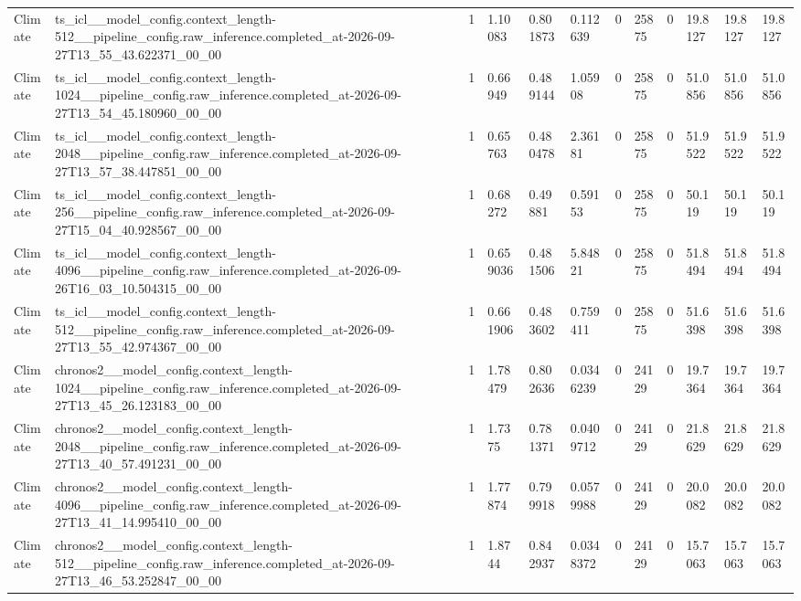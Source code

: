 \begin{tabular}{llllllllllll}
Climate & ts\_icl\_\_model\_config.context\_length-512\_\_pipeline\_config.raw\_inference.completed\_at-2026-09-27T13\_55\_43.622371\_00\_00 & 1 & 1.10083 & 0.801873 & 0.112639 & 0 & 25875 & 0 & 19.8127 & 19.8127 & 19.8127 \\
Climate & ts\_icl\_\_model\_config.context\_length-1024\_\_pipeline\_config.raw\_inference.completed\_at-2026-09-27T13\_54\_45.180960\_00\_00 & 1 & 0.66949 & 0.489144 & 1.05908 & 0 & 25875 & 0 & 51.0856 & 51.0856 & 51.0856 \\
Climate & ts\_icl\_\_model\_config.context\_length-2048\_\_pipeline\_config.raw\_inference.completed\_at-2026-09-27T13\_57\_38.447851\_00\_00 & 1 & 0.65763 & 0.480478 & 2.36181 & 0 & 25875 & 0 & 51.9522 & 51.9522 & 51.9522 \\
Climate & ts\_icl\_\_model\_config.context\_length-256\_\_pipeline\_config.raw\_inference.completed\_at-2026-09-27T15\_04\_40.928567\_00\_00 & 1 & 0.68272 & 0.49881 & 0.59153 & 0 & 25875 & 0 & 50.119 & 50.119 & 50.119 \\
Climate & ts\_icl\_\_model\_config.context\_length-4096\_\_pipeline\_config.raw\_inference.completed\_at-2026-09-26T16\_03\_10.504315\_00\_00 & 1 & 0.659036 & 0.481506 & 5.84821 & 0 & 25875 & 0 & 51.8494 & 51.8494 & 51.8494 \\
Climate & ts\_icl\_\_model\_config.context\_length-512\_\_pipeline\_config.raw\_inference.completed\_at-2026-09-27T13\_55\_42.974367\_00\_00 & 1 & 0.661906 & 0.483602 & 0.759411 & 0 & 25875 & 0 & 51.6398 & 51.6398 & 51.6398 \\
Climate & chronos2\_\_model\_config.context\_length-1024\_\_pipeline\_config.raw\_inference.completed\_at-2026-09-27T13\_45\_26.123183\_00\_00 & 1 & 1.78479 & 0.802636 & 0.0346239 & 0 & 24129 & 0 & 19.7364 & 19.7364 & 19.7364 \\
Climate & chronos2\_\_model\_config.context\_length-2048\_\_pipeline\_config.raw\_inference.completed\_at-2026-09-27T13\_40\_57.491231\_00\_00 & 1 & 1.7375 & 0.781371 & 0.0409712 & 0 & 24129 & 0 & 21.8629 & 21.8629 & 21.8629 \\
Climate & chronos2\_\_model\_config.context\_length-4096\_\_pipeline\_config.raw\_inference.completed\_at-2026-09-27T13\_41\_14.995410\_00\_00 & 1 & 1.77874 & 0.799918 & 0.0579988 & 0 & 24129 & 0 & 20.0082 & 20.0082 & 20.0082 \\
Climate & chronos2\_\_model\_config.context\_length-512\_\_pipeline\_config.raw\_inference.completed\_at-2026-09-27T13\_46\_53.252847\_00\_00 & 1 & 1.8744 & 0.842937 & 0.0348372 & 0 & 24129 & 0 & 15.7063 & 15.7063 & 15.7063 \\

\end{tabular}
